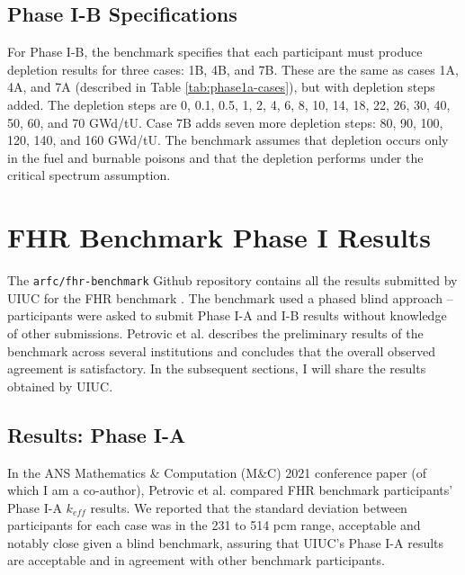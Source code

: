 \subsection{Phase I-B Specifications}
For Phase I-B, the benchmark specifies that each participant must produce 
depletion results for three cases: 1B, 4B, and 7B. 
These are the same as cases 1A, 4A, and 7A (described in Table \ref{tab:phase1a-cases}), 
but with depletion steps added. 
The depletion steps are 0, 0.1, 0.5, 1, 2, 4, 6, 8, 10, 14, 18, 22, 26, 30, 40, 50, 
60, and 70 GWd/tU. 
Case 7B adds seven more depletion steps: 80, 90, 100, 120, 140, and 160 GWd/tU. 
The benchmark assumes that depletion occurs only in the fuel and burnable poisons 
and that the depletion performs under the critical spectrum assumption. 

\section{FHR Benchmark Phase I Results}
The \texttt{arfc/fhr-benchmark} Github repository contains all the results submitted 
by \gls{UIUC} for the \gls{FHR} benchmark \cite{chee_arfcfhr-benchmark_2021}. 
The benchmark used a phased blind approach -- participants were asked to 
submit Phase I-A and I-B results without knowledge of other submissions. 
Petrovic et al. \cite{petrovic_preliminary_2021} describes the preliminary 
results of the benchmark across several institutions and concludes 
that the overall observed agreement is satisfactory. 
In the subsequent sections, I will share the results obtained by \gls{UIUC}. 

\subsection{Results: Phase I-A}
\label{sec:fhr-benchmark-results-ia}
In the \gls{ANS} Mathematics \& Computation (M$\&$C) 2021 conference 
paper (of which I am a co-author), Petrovic et al. \cite{petrovic_preliminary_2021} 
compared \gls{FHR} benchmark participants' Phase I-A $k_{eff}$ results.  
We reported that the standard deviation between participants for each case 
was in the 231 to 514 pcm range, acceptable and notably close given a blind 
benchmark, assuring that \gls{UIUC}'s Phase I-A results are acceptable and 
in agreement with other benchmark participants. 

